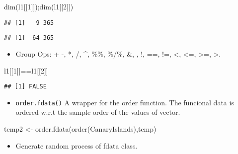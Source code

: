 \documentclass[
]{book}
\newenvironment{Shaded}{\begin{snugshade}}{\end{snugshade}}
\newcommand{\DecValTok}[1]{\textcolor[rgb]{0.00,0.00,0.81}{#1}}
\newcommand{\FunctionTok}[1]{\textcolor[rgb]{0.00,0.00,0.00}{#1}}
\newcommand{\NormalTok}[1]{#1}
\newcommand{\OtherTok}[1]{\textcolor[rgb]{0.56,0.35,0.01}{#1}}
\newcommand{\SpecialCharTok}[1]{\textcolor[rgb]{0.00,0.00,0.00}{#1}}
\providecommand{\tightlist}{%
  \setlength{\itemsep}{0pt}\setlength{\parskip}{0pt}}
\begin{document}
\begin{Shaded}
\begin{Highlighting}[]
\FunctionTok{dim}\NormalTok{(l1[[}\DecValTok{1}\NormalTok{]]);}\FunctionTok{dim}\NormalTok{(l1[[}\DecValTok{2}\NormalTok{]])}
\end{Highlighting}
\end{Shaded}

\begin{verbatim}
## [1]   9 365
\end{verbatim}

\begin{verbatim}
## [1]  64 365
\end{verbatim}

\begin{itemize}
\tightlist
\item
  Group Ops: + -, *, /, \^{}, \%\%, \%/\%, \&, \textbar, !, ==, !=, \textless, \textless=, \textgreater=, \textgreater.
\end{itemize}

\begin{Shaded}
\begin{Highlighting}[]
\NormalTok{l1[[}\DecValTok{1}\NormalTok{]]}\SpecialCharTok{==}\NormalTok{l1[[}\DecValTok{2}\NormalTok{]]}
\end{Highlighting}
\end{Shaded}

\begin{verbatim}
## [1] FALSE
\end{verbatim}

\begin{itemize}
\tightlist
\item
  \texttt{order.fdata()} A wrapper for the order function. The funcional data is ordered w.r.t the sample order of the values of vector.
\end{itemize}

\begin{Shaded}
\begin{Highlighting}[]
\NormalTok{temp2 }\OtherTok{\textless{}{-}} \FunctionTok{order.fdata}\NormalTok{(}\FunctionTok{order}\NormalTok{(CanaryIslands),temp)}
\end{Highlighting}
\end{Shaded}

\begin{itemize}
\tightlist
\item
  Generate random process of fdata class.
\end{itemize}
\end{document}
